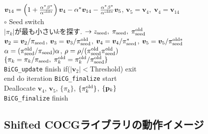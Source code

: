 \documentclass[12pt,titlepage]{jarticle}
\renewenvironment{leftbar}{%
  \def\FrameCommand{\vrule width 1pt \hspace{0pt}}%
  \MakeFramed {\advance\hsize-\width \FrameRestore}}%
 {\endMakeFramed}
\begin{document}
\begin{leftbar}
  \\\hspace{1.0cm}
  ${\boldsymbol v}_{1 4} = \left( 1 + \frac{\alpha^* \beta^*}{\alpha^{{\rm old} *}} \right) {\boldsymbol v}_4
  - \alpha^* {\boldsymbol v}_{1 4} - \frac{\alpha^* \beta^*}{\alpha^{{\rm old} *}} {\boldsymbol v}_5$, 
  ${\boldsymbol v}_5 = {\boldsymbol v}_4,\; 
  {\boldsymbol v}_4 = {\boldsymbol v}_{1 4}$
  \\\hspace{1.0cm}
  $\circ$ Seed switch
  \\\hspace{1.0cm}
  $|\pi_k|$が最も小さい$k$を探す. 
  $\rightarrow z_{\rm seed},\; \pi_{\rm seed},\; \pi_{\rm seed}^{\rm old} $
  \\\hspace{1.0cm}
  ${\boldsymbol v}_2 = {\boldsymbol v}_2 / \pi_{\rm seed}$,
  ${\boldsymbol v}_3 = {\boldsymbol v}_3 / \pi_{\rm seed}^{\rm old}$,
  ${\boldsymbol v}_4 = {\boldsymbol v}_4 / \pi_{\rm seed}^{*}$, 
  ${\boldsymbol v}_5 = {\boldsymbol v}_5 / \pi_{\rm seed}^{\rm old *}$
  \\\hspace{1.0cm}
  $\alpha = (\pi_{\rm seed}^{\rm old} / \pi_{\rm seed}) \alpha$,
  $\rho = \rho / (\pi_{\rm seed}^{\rm old} \pi_{\rm seed}^{\rm old})$
  \\\hspace{1.0cm}
  $\{\pi_k = \pi_k / \pi_{\rm seed},\; \pi_k^{\rm old} = \pi_k^{\rm old} / \pi_{\rm seed}^{\rm old}\}$
  \\\hspace{0.5cm}
\verb|BiCG_update| finish
\end{leftbar}
\vspace{-1em}
\noindent
\hspace{0.5cm}
if($|{\boldsymbol v}_2| < $Threshold) exit
\\
end do iteration
\vspace{-1em}
\begin{leftbar}
\noindent
\verb|BiCG_finalize| start
\\ \hspace{0.5cm}
Deallocate ${\boldsymbol v}_4$, ${\boldsymbol v}_5$, $\{\pi_k\}$, $\{\pi_k^{\rm old}\}$, $\{{\bf p}_k\}$
\\
\verb|BiCG_finalize| finish
\end{leftbar}

\subsection{Shifted COCGライブラリの動作イメージ}
\end{document}
